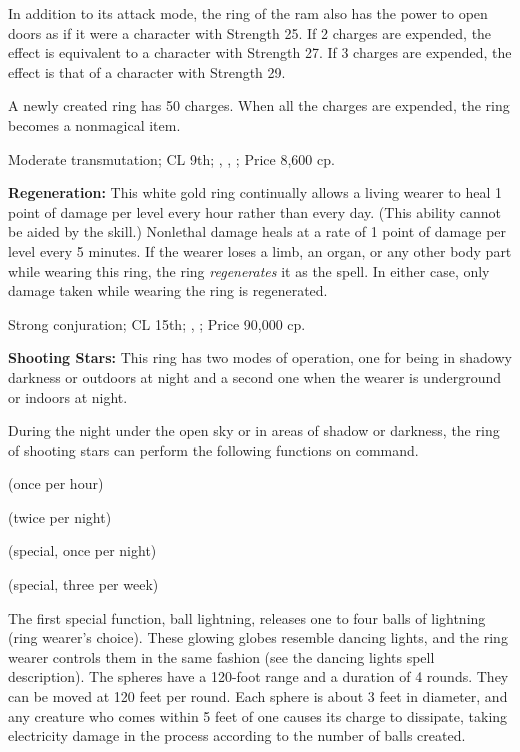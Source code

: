 In addition to its attack mode, the ring of the ram also has the power to open doors as if it were a character with Strength 25. If 2 charges are expended, the effect is equivalent to a character with Strength 27. If 3 charges are expended, the effect is that of a character with Strength 29.

A newly created ring has 50 charges. When all the charges are expended, the ring becomes a nonmagical item.

Moderate transmutation; CL 9th; , , ; Price 8,600 cp.

\textbf{Regeneration:} This white gold ring continually allows a living wearer to heal 1 point of damage per level every hour rather than every day. (This ability cannot be aided by the  skill.) Nonlethal damage heals at a rate of 1 point of damage per level every 5 minutes. If the wearer loses a limb, an organ, or any other body part while wearing this ring, the ring \emph{regenerates} it as the spell. In either case, only damage taken while wearing the ring is regenerated.

Strong conjuration; CL 15th; , ; Price 90,000 cp.

\textbf{Shooting Stars:} This ring has two modes of operation, one for being in shadowy darkness or outdoors at night and a second one when the wearer is underground or indoors at night.

During the night under the open sky or in areas of shadow or darkness, the ring of shooting stars can perform the following functions on command.

\begin{itemize*}
\item {} (once per hour)
\item {} (twice per night)
\item {} (special, once per night)
\item {} (special, three per week)
\end{itemize*}

The first special function, ball lightning, releases one to four balls of lightning (ring wearer's choice). These glowing globes resemble dancing lights, and the ring wearer controls them in the same fashion (see the dancing lights spell description). The spheres have a 120-foot range and a duration of 4 rounds. They can be moved at 120 feet per round. Each sphere is about 3 feet in diameter, and any creature who comes within 5 feet of one causes its charge to dissipate, taking electricity damage in the process according to the number of balls created.

